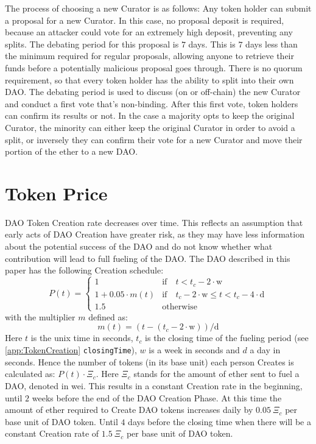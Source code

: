\documentclass[9pt,oneside]{amsart}
\begin{document}
\begin{multicols}{2}
The process of choosing a new Curator is as follows:
Any token holder can submit a proposal for a new Curator. In this case, no proposal deposit is required, because an attacker could vote for an extremely high deposit, preventing any splits. The debating period for this proposal is $7$ days.
This is $7$ days less than the minimum required for regular proposals, allowing anyone to retrieve their funds before a potentially malicious proposal goes through. There is no quorum requirement, so that every token holder has the ability to split into their own DAO.
The debating period is used to discuss (on or off-chain) the new Curator and conduct a first vote that's non-binding. After this first vote, token holders can confirm its results or not. In the case a majority opts to  keep the original Curator, the minority can either keep the original Curator in order to avoid a split, or inversely they can confirm their vote for a new Curator and move their portion of the ether to a new DAO.

\section{Token Price} \label{TokenPrice}
DAO Token Creation rate decreases over time. This reflects an assumption that early acts of DAO Creation have greater risk, as they may have less information about the potential success of the DAO and do not know whether what contribution will lead to full fueling of the DAO.
The DAO described in this paper has the following Creation schedule:
\begin{equation}
 P(t) = \begin{cases}
1 & \text{if} \quad t < t_c - 2 \cdot \text{w} \\
1 + 0.05 \cdot m(t) & \text{if} \quad t_c - 2 \cdot \text{w} \leqslant t < t_c - 4 \cdot \text{d} \\
1.5 & \text{otherwise}
\end{cases}
\end{equation}
with the multiplier $m$ defined as:
\begin{equation}
 m(t) = (t - (t_c - 2 \cdot \text{w})) / \text{d}
\end{equation}
Here $t$ is the unix time in seconds, $t_c$ is the closing time of the fueling period (see \ref{app:TokenCreation} \verb|closingTime|), $w$ is a week in seconds and $d$ a day in seconds.
Hence the number of tokens (in its base unit) each person Creates is calculated as: $P(t) \cdot \Xi_c$. Here $\Xi_c$ stands for the amount of ether sent to fuel a DAO, denoted in wei.
This results in a constant Creation rate in the beginning, until $2$ weeks before the end of the DAO Creation Phase. At this time the amount of ether required to Create DAO tokens increases daily by $0.05 \: \Xi_c$ per base unit of DAO token. Until $4$ days before the closing time when there will be a constant Creation rate of $1.5 \: \Xi_c$ per base unit of DAO token.


\end{multicols}
\end{document}

